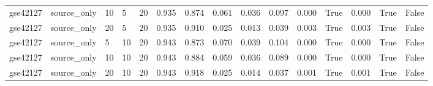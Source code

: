 \begin{table}[t]
\begin{tabular}{lllllllllllllll}
    gse42127 & source\_only & 10 & 5 & 20 & 0.935 & 0.874 & 0.061 & 0.036 & 0.097 & 0.000 & True & 0.000 & True & False \\
    gse42127 & source\_only & 20 & 5 & 20 & 0.935 & 0.910 & 0.025 & 0.013 & 0.039 & 0.003 & True & 0.003 & True & False \\
    gse42127 & source\_only & 5 & 10 & 20 & 0.943 & 0.873 & 0.070 & 0.039 & 0.104 & 0.000 & True & 0.000 & True & False \\
    gse42127 & source\_only & 10 & 10 & 20 & 0.943 & 0.884 & 0.059 & 0.036 & 0.089 & 0.000 & True & 0.000 & True & False \\
    gse42127 & source\_only & 20 & 10 & 20 & 0.943 & 0.918 & 0.025 & 0.014 & 0.037 & 0.001 & True & 0.001 & True & False \\
    \bottomrule
  \end{tabular}
\end{table}
